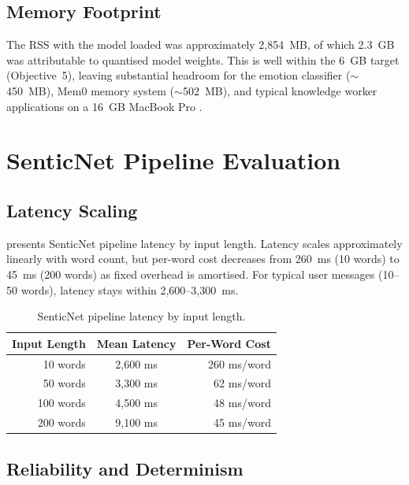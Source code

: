 \subsection{Memory Footprint}
\label{subsec:llm-memory}

The RSS with the model loaded was approximately 2,854~MB, of which 2.3~GB was attributable to quantised model weights. This is well within the 6~GB target (Objective~5), leaving substantial headroom for the emotion classifier ($\sim$450~MB), Mem0 memory system ($\sim$502~MB), and typical knowledge worker applications on a 16~GB MacBook Pro \cite{hannun2023, lin2025, xu2024}.

\section{SenticNet Pipeline Evaluation}
\label{sec:senticnet-evaluation}

\subsection{Latency Scaling}
\label{subsec:senticnet-latency}

 presents SenticNet pipeline latency by input length. Latency scales approximately linearly with word count, but per-word cost decreases from 260~ms (10 words) to 45~ms (200 words) as fixed overhead is amortised. For typical user messages (10--50 words), latency stays within 2,600--3,300~ms.

\begin{table}[htbp]
  \centering
  \caption{SenticNet pipeline latency by input length.}
  \label{tab:senticnet-latency}
  \begin{tabular}{@{}rcr@{}}
    \toprule
    \textbf{Input Length} & \textbf{Mean Latency} & \textbf{Per-Word Cost} \\
    \midrule
    10 words  & 2,600 ms & 260 ms/word \\
    50 words  & 3,300 ms & 62 ms/word  \\
    100 words & 4,500 ms & 48 ms/word  \\
    200 words & 9,100 ms & 45 ms/word  \\
    \bottomrule
  \end{tabular}
\end{table}

\subsection{Reliability and Determinism}
\label{subsec:senticnet-reliability}

